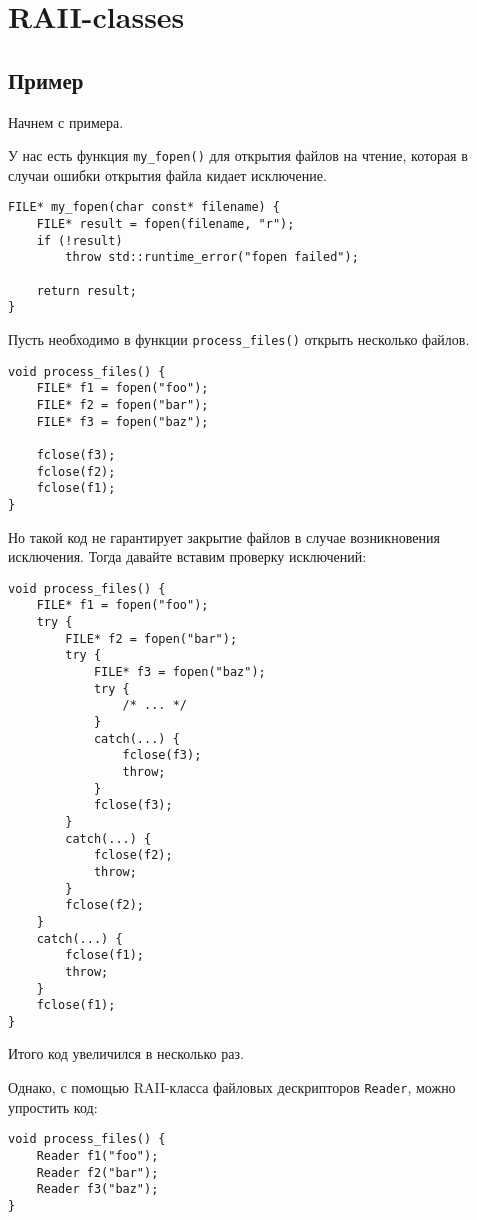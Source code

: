 \section{RAII-classes}
\subsection{Пример}
Начнем с примера.

У нас есть функция \texttt{my_fopen()} для открытия файлов на чтение, которая в случаи ошибки открытия файла кидает исключение.
\begin{verbatim}
FILE* my_fopen(char const* filename) {
    FILE* result = fopen(filename, "r");
    if (!result)
        throw std::runtime_error("fopen failed");

    return result;
}
\end{verbatim}
Пусть необходимо в функции \texttt{process_files()} открыть несколько файлов.
\begin{verbatim}
void process_files() {
    FILE* f1 = fopen("foo");
    FILE* f2 = fopen("bar");
    FILE* f3 = fopen("baz");

    fclose(f3);
    fclose(f2);
    fclose(f1);
}
\end{verbatim}
Но такой код не гарантирует закрытие файлов в случае возникновения исключения.
Тогда давайте вставим проверку исключений:
\begin{verbatim}
void process_files() {
    FILE* f1 = fopen("foo");
    try {
        FILE* f2 = fopen("bar");
        try {
            FILE* f3 = fopen("baz");
            try {
                /* ... */
            }
            catch(...) {
                fclose(f3);
                throw;
            }
            fclose(f3);
        }
        catch(...) {
            fclose(f2);
            throw;
        }
        fclose(f2);
    }
    catch(...) {
        fclose(f1);
        throw;
    }
    fclose(f1);
}
\end{verbatim}
Итого код увеличился в несколько раз.


Однако, с помощью RAII-класса файловых дескрипторов \texttt{Reader}, можно упростить код:
\begin{verbatim}
void process_files() {
    Reader f1("foo");
    Reader f2("bar");
    Reader f3("baz");
}
\end{verbatim}

